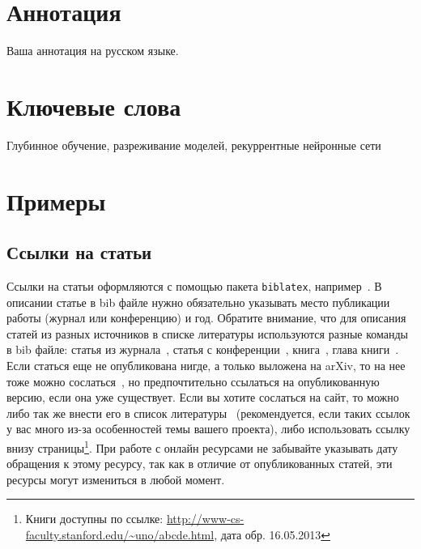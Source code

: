 \documentclass[a4paper,12pt]{extarticle}
\begin{document}
\newpage
\setcounter{page}{2}

{
	\hypersetup{linkcolor=black}
	\tableofcontents
}

\newpage

\newpage
\section*{Аннотация}   %
Ваша аннотация на русском языке.


\section*{Ключевые слова}
Глубинное обучение, разреживание моделей, рекуррентные нейронные сети
\pagebreak

\section{Примеры} 
\subsection{Ссылки на статьи}

Ссылки на статьи оформляются с помощью пакета \texttt{biblatex}, например~\cite{chirkova18}. В описании статье в bib файле нужно обязательно указывать место публикации работы (журнал или конференцию) и год. Обратите внимание, что для описания статей из разных источников в списке литературы используются разные команды в bib файле: статья из журнала~\cite{ctan}, статья с конференции~\cite{chirkova18}, книга~\cite{knuth-acp}, глава книги~\cite{knuth-fa}. Если статься еще не опубликована нигде, а только выложена на arXiv, то на нее тоже можно сослаться~\cite{chirkova18_arxiv}, но предпочтительно ссылаться на опубликованную версию, если она уже существует. Если вы хотите сослаться на сайт, то можно либо так же внести его в список литературы~\cite{knuthwebsite} (рекомендуется, если таких ссылок у вас много из-за особенностей темы вашего проекта), либо использовать ссылку внизу страницы\footnote{Книги доступны по ссылке: \url{http://www-cs-faculty.stanford.edu/~uno/abcde.html}, дата обр. 16.05.2013}. При работе с онлайн ресурсами не забывайте указывать дату обращения к этому ресурсу, так как в отличие от опубликованных статей, эти ресурсы могут измениться в любой момент.
\end{document}

